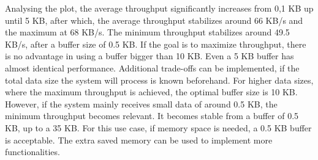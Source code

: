 
Analysing the plot, the average throughput significantly increases from 0,1 KB up until 5 KB, after which, the average throughput stabilizes around 66 KB/s and the maximum at 68 KB/s. The minimum throughput stabilizes around 49.5 KB/s, after a buffer size of 0.5 KB. If the goal is to maximize throughput, there is no advantage in using a buffer bigger than 10 KB. Even a 5 KB buffer has almost identical performance. Additional trade-offs can be implemented, if the total data size the system will process is known beforehand. For higher data sizes, where the maximum throughput is achieved, the optimal buffer size is 10 KB. However, if the system mainly receives small data of around 0.5 KB, the minimum throughput becomes relevant. It becomes stable from a buffer of 0.5 KB, up to a 35 KB. For this use case, if memory space is needed, a 0.5 KB buffer is acceptable. The extra saved memory can be used to implement more functionalities.




